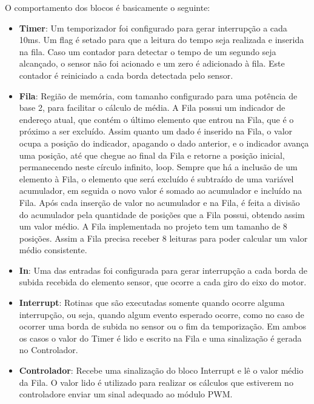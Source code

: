 O comportamento dos blocos é basicamente o seguinte:

\begin{itemize}

\item \textbf{Timer}: Um temporizador foi configurado para gerar interrupção a cada 10ms. 
Um flag é setado para que a leitura do tempo seja realizada e inserida na fila.
Caso um contador para detectar o tempo de um segundo seja alcançado, o sensor não foi acionado e um zero é adicionado à fila. 
Este contador é reiniciado a cada borda detectada pelo sensor.

\item \textbf{Fila}: Região de memória, com tamanho configurado para uma potência de base 2, para facilitar o cálculo de média. 
A Fila possui um indicador de endereço atual, que contém o último elemento que entrou na Fila, que é o próximo a ser excluído. Assim quanto um dado é inserido na Fila, o valor ocupa a posição do indicador, apagando o dado anterior, e o indicador avança uma posição, até que chegue ao final da Fila e retorne a posição inicial, permanecendo neste círculo infinito, loop. 
Sempre que há a inclusão de um elemento à Fila, o elemento que será excluído é subtraído de uma variável acumulador, em seguida o novo valor é somado ao acumulador e incluído na Fila. 
Após cada inserção de valor no acumulador e na Fila, é feita a divisão do acumulador pela quantidade de posições que a Fila possui, obtendo assim um valor médio. 
A Fila implementada no projeto tem um tamanho de 8 posições. Assim a Fila precisa receber 8 leituras para poder calcular um valor médio consistente. 


\item \textbf{In}: Uma das entradas foi configurada para gerar interrupção a cada borda de subida recebida do elemento sensor, que ocorre a cada giro do eixo do motor. 


\item \textbf{Interrupt}: Rotinas que são executadas somente quando ocorre alguma interrupção, ou seja, quando algum evento esperado ocorre, como no caso de ocorrer uma borda de subida no sensor ou o fim da temporização. 
Em ambos os casos o valor do Timer é lido e escrito na Fila e uma sinalização é gerada no Controlador. 



\item \textbf{Controlador}: Recebe uma sinalização do bloco Interrupt e lê o valor médio da Fila. 
O valor lido é utilizado para realizar os cálculos que estiverem no controladore enviar um sinal adequado ao módulo PWM.



\end{itemize}
